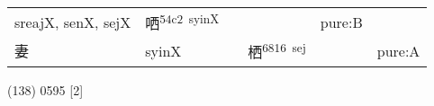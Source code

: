 \documentclass[14pt,a4paper]{scrartcl}
\begin{document}
\begin{longtable}[c]{@{}llllll@{}}
\begin{minipage}[t]{0.14\columnwidth}
sreajX, senX, sejX
\strut\end{minipage} &
\begin{minipage}[t]{0.14\columnwidth}\raggedright\strut
哂\textsuperscript{54c2~syinX}
\strut\end{minipage} &
\begin{minipage}[t]{0.14\columnwidth}\raggedright\strut
\strut\end{minipage} &
\begin{minipage}[t]{0.14\columnwidth}\raggedright\strut
\strut\end{minipage} &
\begin{minipage}[t]{0.14\columnwidth}\raggedright\strut
pure:B
\strut\end{minipage}\tabularnewline
\begin{minipage}[t]{0.14\columnwidth}\raggedright\strut
妻
\strut\end{minipage} &
\begin{minipage}[t]{0.14\columnwidth}\raggedright\strut
syinX
\strut\end{minipage} &
\begin{minipage}[t]{0.14\columnwidth}\raggedright\strut
\strut\end{minipage} &
\begin{minipage}[t]{0.14\columnwidth}\raggedright\strut
栖\textsuperscript{6816~sej}
\strut\end{minipage} &
\begin{minipage}[t]{0.14\columnwidth}\raggedright\strut
\strut\end{minipage} &
\begin{minipage}[t]{0.14\columnwidth}\raggedright\strut
pure:A
\strut\end{minipage}\tabularnewline
\bottomrule
\end{longtable}

(138) 0595 {[}2{]}
\end{document}
